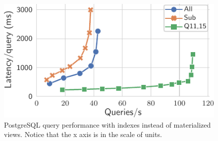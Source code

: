\documentclass[sigplan,twocolumn,review,anonymous]{acmart}
\begin{document}
\begin{figure}
\begin{minipage}{.55\linewidth}
		\label{fig:postgres}
	\vspace*{-0.2em}
	\end{minipage}%
	\hspace*{0.05\linewidth}
	\begin{minipage}{.38\linewidth}
		\centering
		\includegraphics[width=0.85\linewidth]{postgres/postgresNoView}
		\caption{PostgreSQL query performance with indexes instead of materialized views. Notice that the x axis is in the scale of units.}
		\label{fig:postgresNoViews}
	\end{minipage}
\end{figure}

\end{document}
